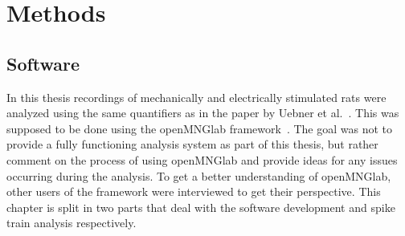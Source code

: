 \chapter{Methods}
\begin{comment}
In this chapter I will describe the methods I used for creating the software and spike analysis results in this thesis\\
-Describe the different data structures (Neo, old openMNGlab version)\\
-Detail the development process, issues during development and how they were resolved\\
-Describe the finished analysis pipeline with the help of a simplified graph\\
-present use cases (3 students analysing different data, experimental scientist)\\

Spike Analysis:\\
-Data\\
-definition of spike trains\\
-quantifiers\\

TODO:\\
-Add what I did: somewhat detailed description of my process in developing the notebook\\
-start from the notebook which was started by Radomir for custom structure (before openMNGlab)\\
-adding of importers from old openMNGlab version (code from Fabian)\\
-adding of neo importers after integration into openMNGlab\\
\end{comment}
\section{Software}
In this thesis recordings of mechanically and electrically stimulated rats were analyzed using the same quantifiers as in the paper by Uebner et al.~\cite{roberto}. This was supposed to be done using the openMNGlab framework~\cite{schlebusch_openmnglab_2021}. The goal was not to provide a fully functioning analysis system as part of this thesis, but rather comment on the process of using openMNGlab and provide ideas for any issues occurring during the analysis. To get a better understanding of openMNGlab, other users of the framework were interviewed to get their perspective.
This chapter is split in two parts that deal with the software development and spike train analysis respectively.

